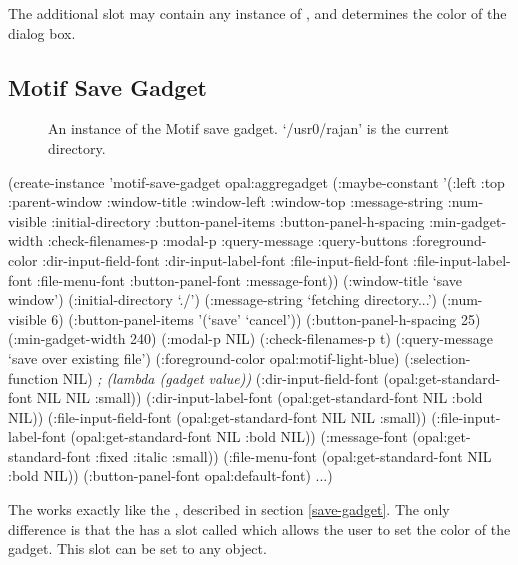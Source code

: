 The additional  slot may contain any instance of
, and determines the color of the dialog box.


\begin{group}
\section{Motif Save Gadget}
\label{motif-save-gadget}
\begin{figure}
\begin{center}
\end{center}
\caption{An instance of the Motif save gadget.  `/usr0/rajan' is the
current directory.}
\end{figure}
\end{group}

\begin{programexample}
(create-instance 'motif-save-gadget opal:aggregadget
  (:maybe-constant '(:left :top :parent-window :window-title :window-left :window-top
		     :message-string :num-visible :initial-directory :button-panel-items
		     :button-panel-h-spacing :min-gadget-width :check-filenames-p
                     :modal-p :query-message :query-buttons :foreground-color
                     :dir-input-field-font :dir-input-label-font :file-input-field-font
                     :file-input-label-font :file-menu-font :button-panel-font
                     :message-font))
  (:window-title `save window')
  (:initial-directory `./')
  (:message-string `fetching directory...')
  (:num-visible 6)
  (:button-panel-items '(`save' `cancel'))
  (:button-panel-h-spacing 25)
  (:min-gadget-width 240)
  (:modal-p NIL)
  (:check-filenames-p t)
  (:query-message `save over existing file')
  (:foreground-color opal:motif-light-blue)
  (:selection-function NIL)   {\it ; (lambda (gadget value))}
  (:dir-input-field-font (opal:get-standard-font NIL NIL :small))
  (:dir-input-label-font (opal:get-standard-font NIL :bold NIL))
  (:file-input-field-font (opal:get-standard-font NIL NIL :small))
  (:file-input-label-font (opal:get-standard-font NIL :bold NIL))
  (:message-font (opal:get-standard-font :fixed :italic :small))
  (:file-menu-font (opal:get-standard-font NIL :bold NIL))
  (:button-panel-font opal:default-font)
  ...)
\end{programexample}

The  works exactly like the , described
in section \ref{save-gadget}.  The only
difference is that the  has a slot called
 which allows the user to set the color of the
gadget.  This slot can be set to any  object.

